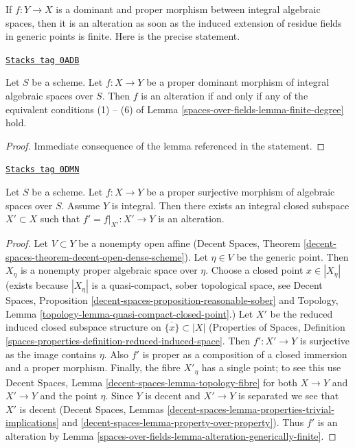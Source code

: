 If $f : Y \to X$ is a dominant and proper morphism between integral
algebraic spaces, then it is an alteration as soon as the induced
extension of residue fields in generic points is finite. Here is the
precise statement.

\begin{lemma}
\label{spaces-over-fields-lemma-alteration-generically-finite}
\href{https://stacks.math.columbia.edu/tag/0ADB}{\texttt{Stacks tag 0ADB}}

Let $S$ be a scheme. Let $f : X \to Y$ be a proper dominant morphism of
integral algebraic spaces over $S$. Then $f$ is an alteration
if and only if any of the equivalent conditions (1) -- (6) of
Lemma \ref{spaces-over-fields-lemma-finite-degree} hold.
\end{lemma}

\begin{proof}
Immediate consequence of the lemma referenced in the statement.
\end{proof}

\begin{lemma}
\label{spaces-over-fields-lemma-alteration-contained-in}
\href{https://stacks.math.columbia.edu/tag/0DMN}{\texttt{Stacks tag 0DMN}}

Let $S$ be a scheme. Let $f : X \to Y$ be a proper surjective morphism of
algebraic spaces over $S$. Assume $Y$ is integral. Then
there exists an integral closed subspace $X' \subset X$ such that
$f' = f|_{X'} : X' \to Y$ is an alteration.
\end{lemma}

\begin{proof}
Let $V \subset Y$ be a nonempty open affine
(Decent Spaces, Theorem \ref{decent-spaces-theorem-decent-open-dense-scheme}).
Let $\eta \in V$ be the generic point. Then
$X_\eta$ is a nonempty proper algebraic space over $\eta$.
Choose a closed point $x \in |X_\eta|$
(exists because $|X_\eta|$ is a quasi-compact, sober
topological space, see Decent Spaces, Proposition
\ref{decent-spaces-proposition-reasonable-sober}
and Topology, Lemma \ref{topology-lemma-quasi-compact-closed-point}.)
Let $X'$ be the reduced induced closed subspace structure on
$\overline{\{x\}} \subset |X|$ (Properties of Spaces, Definition
\ref{spaces-properties-definition-reduced-induced-space}.
Then $f' : X' \to Y$ is surjective as the image contains $\eta$.
Also $f'$ is proper as a composition of a closed immersion
and a proper morphism. Finally, the fibre $X'_\eta$ has a
single point; to see this use
Decent Spaces, Lemma \ref{decent-spaces-lemma-topology-fibre}
for both $X \to Y$ and $X' \to Y$ and the point $\eta$.
Since $Y$ is decent and $X' \to Y$ is separated we see that $X'$ is decent
(Decent Spaces, Lemmas
\ref{decent-spaces-lemma-properties-trivial-implications} and
\ref{decent-spaces-lemma-property-over-property}).
Thus $f'$ is an alteration by
Lemma \ref{spaces-over-fields-lemma-alteration-generically-finite}.
\end{proof}

